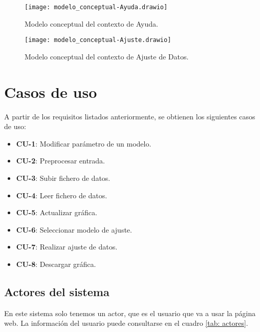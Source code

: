 \begin{figure}[!h]
\begin{center}
\caption{Modelo conceptual del contexto de Ayuda.}
\label{diag: modelo_concep_ayuda}
\texttt{[image: modelo\_conceptual-Ayuda.drawio]}
\end{center}
\end{figure}

\begin{figure}[!h]
\begin{center}
\caption{Modelo conceptual del contexto de Ajuste de Datos.}
\label{diag: modelo_concep_ajuste}
\texttt{[image: modelo\_conceptual-Ajuste.drawio]}
\end{center}
\end{figure}





\section{Casos de uso}

A partir de los requisitos listados anteriormente, se obtienen los siguientes casos de uso:

\begin{itemize}
\item \textbf{CU-1}: Modificar parámetro de un modelo.
\item \textbf{CU-2}: Preprocesar entrada.
\item \textbf{CU-3}: Subir fichero de datos.
\item \textbf{CU-4}: Leer fichero de datos.
\item \textbf{CU-5}: Actualizar gráfica.
\item \textbf{CU-6}: Seleccionar modelo de ajuste.
\item \textbf{CU-7}: Realizar ajuste de datos.
\item \textbf{CU-8}: Descargar gráfica.
\end{itemize}

\subsection{Actores del sistema}

En este sistema solo tenemos un actor, que es el usuario que va a usar la página web. La información del usuario puede consultarse en el cuadro \ref{tab: actores}.

